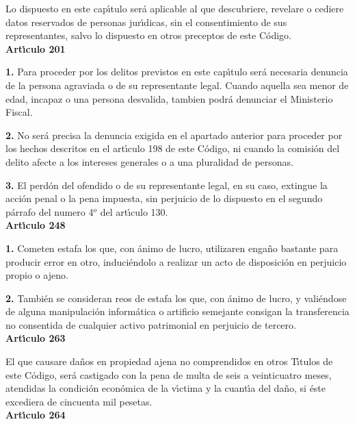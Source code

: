Lo dispuesto en este cap\'{\i}tulo ser\'a aplicable al que descubriere, 
revelare o cediere datos reservados de personas jur\'{\i}dicas, sin el 
consentimiento de sus representantes, salvo lo dispuesto en otros preceptos de 
este C\'odigo. 
\vspace{0.3cm}\\ 
{\large {\bf Art\'{\i}culo 201}}
 
{\bf 1.} Para proceder por los delitos previstos en este cap\'{\i}tulo ser\'a 
necesaria denuncia de la persona agraviada o de su representante legal. Cuando 
aquella sea menor de edad, incapaz o una persona desvalida, tambien podr\'a 
denunciar el Ministerio Fiscal. 
 
{\bf 2.} No ser\'a precisa la denuncia exigida en el apartado anterior para 
proceder por los hechos descritos en el art\'{\i}culo 198 de este C\'odigo, ni 
cuando la comisi\'on del delito afecte a los intereses generales o a una 
pluralidad de personas. 
 
{\bf 3.} El perd\'on del ofendido o de su representante legal, en su caso, 
extingue la acci\'on penal o la pena impuesta, sin perjuicio de lo dispuesto en 
el segundo p\'arrafo del numero 4$^{o}$ del art\'{\i}culo 130. 
\vspace{0.3cm}\\ 
{\large {\bf Art\'{\i}culo 248}}

{\bf 1.} Cometen estafa los que, con \'animo de lucro, utilizaren enga\~no 
bastante para producir error en otro, induci\'endolo a realizar un acto de 
disposici\'on en perjuicio propio o ajeno. 
 
{\bf 2.} Tambi\'en se consideran reos de estafa los que, con \'animo de lucro, 
y vali\'endose de alguna manipulaci\'on inform\'atica o artificio semejante 
consigan la transferencia no consentida de cualquier activo patrimonial en 
perjuicio de tercero. 
\vspace{0.3cm}\\ 
{\large {\bf Art\'{\i}culo 263}}
 
El que causare da\~nos en propiedad ajena no comprendidos en otros T\'{\i}tulos 
de este C\'odigo, ser\'a castigado con la pena de multa de seis a veinticuatro 
meses, atendidas la condici\'on econ\'omica de la v\'{\i}ctima y la 
cuant\'{\i}a del da\~no, si \'este excediera de cincuenta mil pesetas. 
\vspace{0.3cm}\\ 
{\large {\bf Art\'{\i}culo 264}}
 
